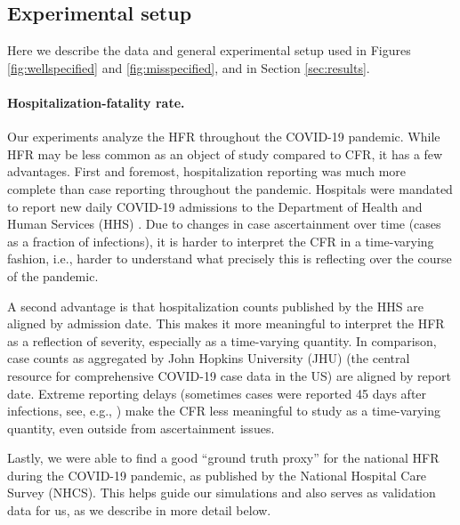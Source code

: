 \documentclass{article}
\begin{document}
\subsection{Experimental setup}
\label{sec:setup}

Here we describe the data and general experimental setup used in Figures
\ref{fig:wellspecified} and \ref{fig:misspecified}, and in Section
\ref{sec:results}.    

\paragraph{Hospitalization-fatality rate.}

Our experiments analyze the HFR throughout the COVID-19 pandemic. While HFR may 
be less common as an object of study compared to CFR, it has a few
advantages. First and foremost, hospitalization reporting was much more complete
than case reporting throughout the pandemic. Hospitals were mandated to report
new daily COVID-19 admissions to the Department of Health and Human Services
(HHS) \citep{HHS2023}. Due to changes in case ascertainment over time (cases as
a fraction of infections), it is harder to interpret the CFR in a time-varying
fashion, i.e., harder to understand what precisely this is reflecting over the
course of the pandemic.  

A second advantage is that hospitalization counts published by the HHS are
aligned by admission date. This makes it more meaningful to interpret the HFR as
a reflection of severity, especially as a time-varying quantity. In comparison,
case counts as aggregated by John Hopkins University (JHU) \citep{JHU} (the
central resource for comprehensive COVID-19 case data in the US) are aligned by
report date. Extreme reporting delays (sometimes cases were reported 45 days
after infections, see, e.g., \citealp{Jahja2022}) make the CFR less meaningful
to study as a time-varying quantity, even outside from ascertainment issues.  


Lastly, we were able to find a good ``ground truth proxy'' for the national HFR
during the COVID-19 pandemic, as published by the National Hospital Care Survey
(NHCS). This helps guide our simulations and also serves as validation data for
us, as we describe in more detail below.  
\end{document}
